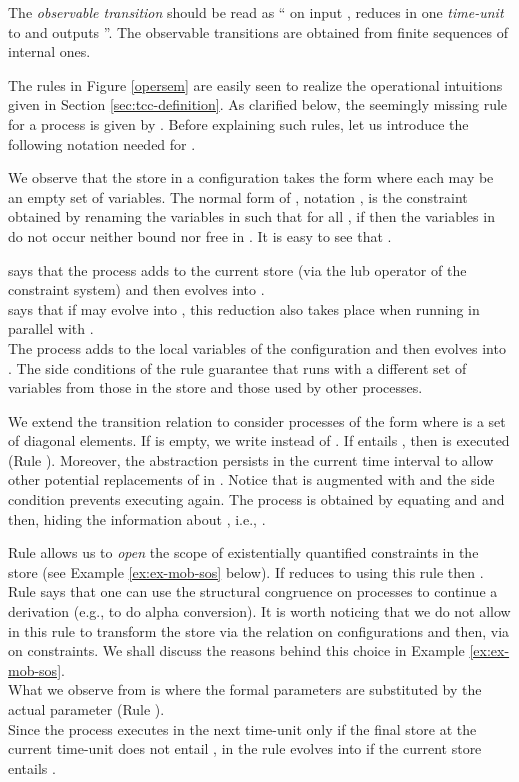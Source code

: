 \documentclass{tlp}
\begin{document}
 The \emph{observable transition} {\small } should be read as ``
on input , reduces
in one \emph{time-unit} to  and outputs ''. The observable 
transitions are obtained from finite sequences of internal ones. 

The rules in Figure \ref{opersem} 
are easily seen to realize the operational  intuitions given in Section \ref{sec:tcc-definition}. As clarified below, the seemingly missing rule  for a   process is given by .  Before  explaining such rules, let us introduce the following notation needed for  .

\begin{notation}\label{not:nf}
We observe that  the store  in a configuration takes the form  where each  may be an empty set of variables. The normal form of , notation , is the constraint obtained by renaming the variables in  such that for all , if   then the variables in   do not occur neither bound nor free in . It is easy to see that . 
\end{notation}


\noindent{-}  says that the process  adds  to the current store  (via the lub operator of the constraint system) and then evolves into .
\\\noindent{-}   says that if  may evolve into , this reduction also takes place when running in parallel with  . 
\\\noindent{-} The process  
adds  to the local variables of the configuration and then evolves into .  The side conditions of the rule  guarantee that  runs with a different set of variables from those in the store and those used by other processes. 

\noindent{-} We extend the transition relation to consider processes of the form  where  is a set of diagonal elements. 
If  is empty, we write  instead of . If  entails , then    is executed (Rule ).
Moreover, the abstraction persists in the current time interval to allow other potential replacements of  in . Notice that  is augmented with  
and the side condition  prevents  executing    again.   The process  is obtained by equating   and   and then, hiding the information about  , i.e., . 



\noindent{-} Rule  allows us to \emph{open} the scope of  existentially quantified constraints in the store  (see Example \ref{ex:ex-mob-sos} below). If  reduces to  using this rule then . 
\\\noindent{-} Rule  says that one can use the structural congruence on processes to continue a derivation (e.g., to do alpha conversion). It is worth noticing that we do not allow in this rule to transform the store via the relation  on configurations and then, via  on constraints. We shall discuss the reasons  behind  this choice  in  Example \ref{ex:ex-mob-sos}. 
\\\noindent{-}What we observe from  is  where the formal 
parameters are substituted by the actual parameter (Rule ). 
\\\noindent{-} Since the process  executes  in the next time-unit only if  the final store at the current time-unit  does not entail , in the rule   evolves into  if the current store  entails . 
\end{document}
